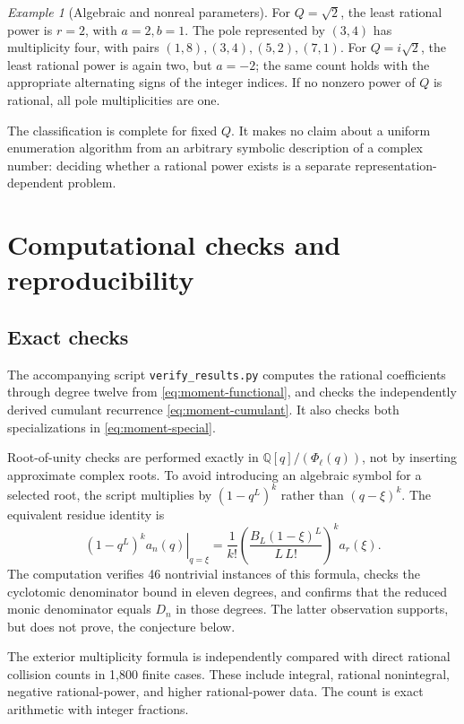 \documentclass[11pt,a4paper]{article}
\numberwithin{equation}{section}
\theoremstyle{definition}
\theoremstyle{remark}
\newtheorem{example}[theorem]{Example}
\newcommand{\Q}{\mathbb Q}
\begin{document}
\begin{example}[Algebraic and nonreal parameters]
For \(Q=\sqrt2\), the least rational power is \(r=2\), with \(a=2,b=1\). The pole represented by \((3,4)\) has multiplicity four, with pairs
\((1,8),(3,4),(5,2),(7,1)\). For \(Q=i\sqrt2\), the least rational power is again two, but \(a=-2\); the same count holds with the appropriate alternating signs of the integer indices. If no nonzero power of \(Q\) is rational, all pole multiplicities are one.
\end{example}

The classification is complete for fixed \(Q\). It makes no claim about a uniform enumeration algorithm from an arbitrary symbolic description of a complex number: deciding whether a rational power exists is a separate representation-dependent problem.

\section{Computational checks and reproducibility}
\subsection{Exact checks}
The accompanying script \texttt{verify\_results.py} computes the rational coefficients through degree twelve from \eqref{eq:moment-functional}, and checks the independently derived cumulant recurrence \eqref{eq:moment-cumulant}. It also checks both specializations in \eqref{eq:moment-special}.

Root-of-unity checks are performed exactly in \(\Q[q]/(\Phi_\ell(q))\), not by inserting approximate complex roots. To avoid introducing an algebraic symbol for a selected root, the script multiplies by \((1-q^L)^k\) rather than \((q-\xi)^k\). The equivalent residue identity is
\begin{equation}\label{eq:check-residue}
 \left.(1-q^L)^ka_n(q)\right|_{q=\xi}
 =\frac1{k!}\left(\frac{B_L(1-\xi)^L}{L\,L!}\right)^k a_r(\xi).
\end{equation}
The computation verifies 46 nontrivial instances of this formula, checks the cyclotomic denominator bound in eleven degrees, and confirms that the reduced monic denominator equals \(D_n\) in those degrees. The latter observation supports, but does not prove, the conjecture below.

The exterior multiplicity formula is independently compared with direct rational collision counts in 1,800 finite cases. These include integral, rational nonintegral, negative rational-power, and higher rational-power data. The count is exact arithmetic with integer fractions.
\end{document}
